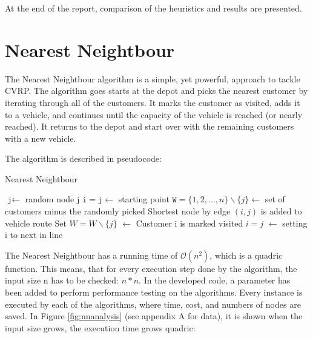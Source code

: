 \documentclass[12pt]{article}
\newcommand{\var}{\texttt}
\begin{document}
At the end of the report, comparison of the heuristics and results are presented.

\newpage

\section{Nearest Neightbour} 

The Nearest Neightbour algorithm is a simple, yet powerful, approach to tackle CVRP. The algorithm goes starts at the depot and picks the nearest customer by iterating through all of the customers. It marks the customer as visited, adds it to a vehicle, and continues until the capacity of the vehicle is reached (or nearly reached). It returns to the depot and start over with the remaining customers with a new vehicle. 

The algorithm is described in pseudocode:
\newline

\begin{algorithm}[!ht]
	\caption{Nearest Neightbour}\label{euclid}
	\begin{algorithmic}[1]
	\State $\var{j} \gets$ random node j
	\State $\var{i} = \var{j} \gets$ starting point
	\State $\var{W} = \{1, 2, ..., n\} \backslash \{j\} \gets$ set of customers minus the randomly picked
			\State {}
			\State Shortest node by edge $(i,j)$ is added to vehicle route
			\State Set $W = W \backslash \{j\}$ $\gets$ Customer i is marked visited
			\State $i = j$ $\gets$ setting i to next in line

		\EndWhile
	\EndFunction

	\end{algorithmic}
\end{algorithm}

The Nearest Neightbour has a running time of $\mathcal{O}(n^2)$, which is a quadric function. This means, that for every execution step done by the algorithm, the input size n has to be checked: $ n * n$.  
In the developed code, a parameter has been added to perform performance testing on the algorithms. Every instance is executed by each of the algorithms, where time, cost, and numbers of nodes are saved. In Figure \ref{fig:nnanalysis} (see appendix A for data), it is shown when the input size grows, the execution time grows quadric:
\end{document}

